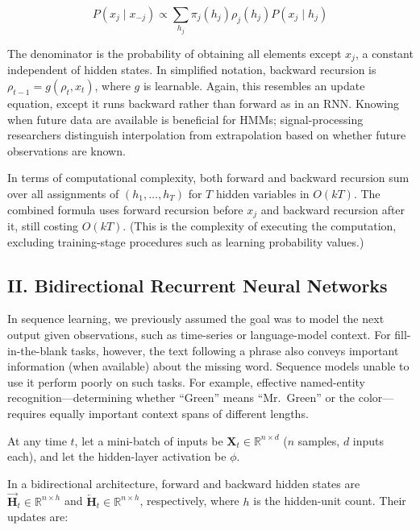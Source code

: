 \[
P(x_j \mid x_{-j}) \propto \sum_{h_j}\pi_j(h_j)\rho_j(h_j)P(x_j \mid h_j)
\]

The denominator is the probability of obtaining all elements except \(x_j\), a constant independent of hidden states. In simplified notation, backward recursion is \(\rho_{t-1}=g(\rho_t,x_t)\), where \(g\) is learnable. Again, this resembles an update equation, except it runs backward rather than forward as in an RNN. Knowing when future data are available is beneficial for HMMs; signal-processing researchers distinguish interpolation from extrapolation based on whether future observations are known.

In terms of computational complexity, both forward and backward recursion sum over all assignments of \((h_1,\ldots,h_T)\) for \(T\) hidden variables in \(O(kT)\). The combined formula uses forward recursion before \(x_j\) and backward recursion after it, still costing \(O(kT)\). (This is the complexity of executing the computation, excluding training-stage procedures such as learning probability values.)

\hypertarget{ii.-bidirectional-recurrent-neural-networks}{%
\subsection{II. Bidirectional Recurrent Neural Networks}\label{ii.-bidirectional-recurrent-neural-networks}}

In sequence learning, we previously assumed the goal was to model the next output given observations, such as time-series or language-model context. For fill-in-the-blank tasks, however, the text following a phrase also conveys important information (when available) about the missing word. Sequence models unable to use it perform poorly on such tasks. For example, effective named-entity recognition---determining whether ``Green'' means ``Mr.~Green'' or the color---requires equally important context spans of different lengths.

At any time \(t\), let a mini-batch of inputs be \(\mathbf{X}_t \in \mathbb{R}^{n \times d}\) (\(n\) samples, \(d\) inputs each), and let the hidden-layer activation be \(\phi\).

In a bidirectional architecture, forward and backward hidden states are \(\overrightarrow{\mathbf{H}}_t \in \mathbb{R}^{n \times h}\) and \(\overleftarrow{\mathbf{H}}_t \in \mathbb{R}^{n \times h}\), respectively, where \(h\) is the hidden-unit count. Their updates are:

